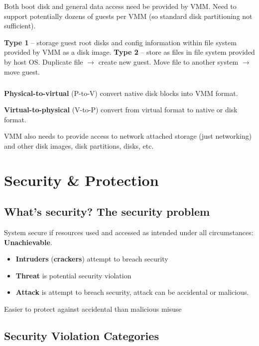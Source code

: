 Both boot disk and general data access need be provided by VMM. Need to support potentially dozens of guests per VMM (so standard
disk partitioning not sufficient).


\textbf{Type 1} – storage guest root disks and config information within file
system provided by VMM as a disk image.
\textbf{Type 2 }– store as files in file system provided by host OS.
Duplicate file $\to$ create new guest.
Move file to another system $\to$ move guest.

\paragraph{}
\textbf{Physical-to-virtual} (P-to-V) convert native disk blocks into VMM format.

\textbf{Virtual-to-physical} (V-to-P) convert from virtual format to native or disk format.

VMM also needs to provide access to network attached storage (just
networking) and other disk images, disk partitions, disks, etc.


\chapter{Security \& Protection}

\section{What's security? The security problem}

System secure if resources used and accessed as intended under all
circumstances: \textbf{Unachievable}.

\begin{itemize}
    \item \textbf{Intruders} (\textbf{crackers}) attempt to breach security
    \item \textbf{Threat} is potential security violation
    \item \textbf{Attack} is attempt to breach security, attack can be accidental or malicious.
\end{itemize}

Easier to protect against accidental than malicious misuse

\section{Security Violation Categories}

